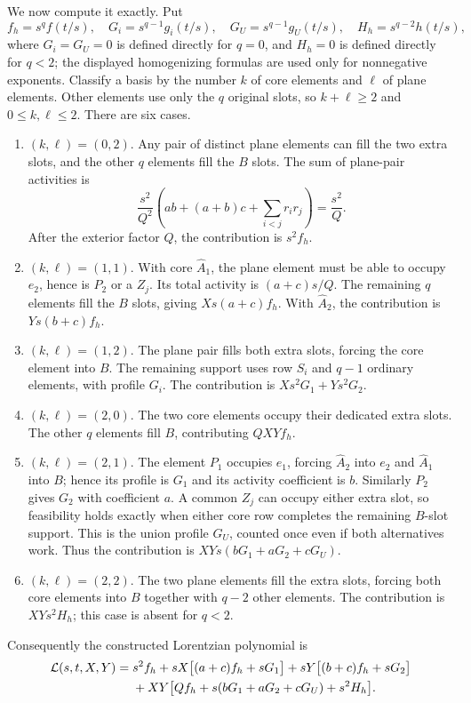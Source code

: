 We now compute it exactly. Put
\[
 f_h=s^qf(t/s),\quad G_i=s^{q-1}g_i(t/s),\quad
 G_U=s^{q-1}g_U(t/s),\quad H_h=s^{q-2}h(t/s),
\]
where $G_i=G_U=0$ is defined directly for $q=0$, and $H_h=0$ is defined directly for $q<2$; the displayed homogenizing formulas are used only for nonnegative exponents. Classify a basis by the number $k$ of core elements and $\ell$ of plane elements. Other elements use only the $q$ original slots, so $k+\ell\ge2$ and $0\le k,\ell\le2$. There are six cases.
\begin{enumerate}
\item $(k,\ell)=(0,2)$. Any pair of distinct plane elements can fill the two extra slots, and the other $q$ elements fill the $B$ slots. The sum of plane-pair activities is
\[
 \frac{s^2}{Q^2}\left(ab+(a+b)c+\sum_{i<j}r_ir_j\right)=\frac{s^2}{Q}.
\]
After the exterior factor $Q$, the contribution is $s^2f_h$.
\item $(k,\ell)=(1,1)$. With core $\widehat A_1$, the plane element must be able to occupy $e_2$, hence is $P_2$ or a $Z_j$. Its total activity is $(a+c)s/Q$. The remaining $q$ elements fill the $B$ slots, giving $Xs(a+c)f_h$. With $\widehat A_2$, the contribution is $Ys(b+c)f_h$.
\item $(k,\ell)=(1,2)$. The plane pair fills both extra slots, forcing the core element into $B$. The remaining support uses row $S_i$ and $q-1$ ordinary elements, with profile $G_i$. The contribution is $Xs^2G_1+Ys^2G_2$.
\item $(k,\ell)=(2,0)$. The two core elements occupy their dedicated extra slots. The other $q$ elements fill $B$, contributing $QXYf_h$.
\item $(k,\ell)=(2,1)$. The element $P_1$ occupies $e_1$, forcing $\widehat A_2$ into $e_2$ and $\widehat A_1$ into $B$; hence its profile is $G_1$ and its activity coefficient is $b$. Similarly $P_2$ gives $G_2$ with coefficient $a$. A common $Z_j$ can occupy either extra slot, so feasibility holds exactly when either core row completes the remaining $B$-slot support. This is the union profile $G_U$, counted once even if both alternatives work. Thus the contribution is $XYs(bG_1+aG_2+cG_U)$.
\item $(k,\ell)=(2,2)$. The two plane elements fill the extra slots, forcing both core elements into $B$ together with $q-2$ other elements. The contribution is $XYs^2H_h$; this case is absent for $q<2$.
\end{enumerate}
Consequently the constructed Lorentzian polynomial is
\begin{align}\label{eq:fulllift}
 \mathcal L(s,t,X,Y)={}&s^2f_h+sX\big[(a+c)f_h+sG_1\big]
 +sY\big[(b+c)f_h+sG_2\big]\notag\\
 &+XY\big[Qf_h+s(bG_1+aG_2+cG_U)+s^2H_h\big].
\end{align}
